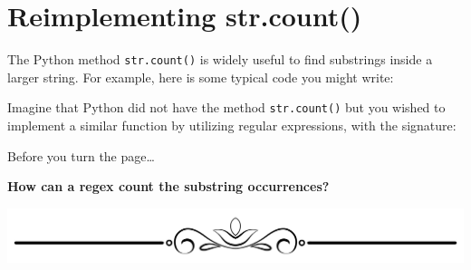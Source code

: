 \newpage

\hypertarget{reimplementing-str.count}{%
\section{Reimplementing str.count()}\label{reimplementing-str.count}}

The Python method \texttt{str.count()} is widely useful to find
substrings inside a larger string. For example, here is some typical
code you might write:

\begin{Shaded}
\begin{Highlighting}[]
\OperatorTok{\textgreater{}\textgreater{}\textgreater{}}\OperatorTok{=} 
\OperatorTok{\textgreater{}\textgreater{}\textgreater{}}\NormalTok{)}
\OperatorTok{\textgreater{}\textgreater{}\textgreater{}}\NormalTok{)}
\end{Highlighting}
\end{Shaded}

Imagine that Python did not have the method \texttt{str.count()} but you
wished to implement a similar function by utilizing regular expressions,
with the signature:

\begin{Shaded}
\begin{Highlighting}[]
\NormalTok{) }\OperatorTok{{-}\textgreater{}} \NormalTok{:}
\end{Highlighting}
\end{Shaded}

Before you turn the page\ldots{}

\textbf{How can a regex count the substring occurrences?}

\includegraphics{images/Elegant-Flourish-Frame-Extrapolated-19.svg}

